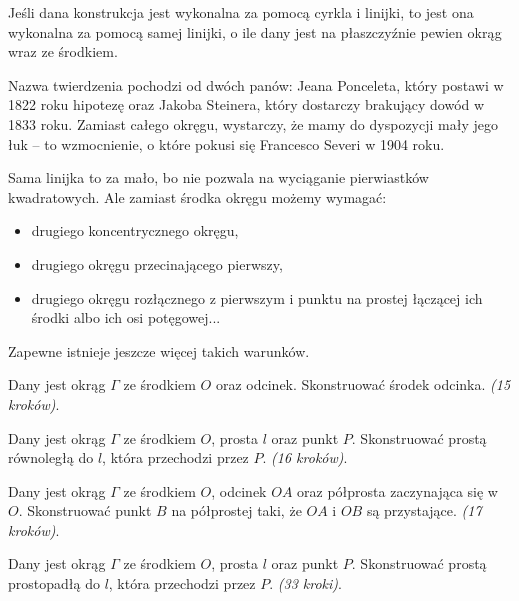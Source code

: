 %

\begin{theorem}
\label{thm:poncelet_steiner}%
    Jeśli dana konstrukcja jest wykonalna za pomocą cyrkla i linijki, to jest ona wykonalna za pomocą samej linijki, o ile dany jest na płaszczyźnie pewien okrąg wraz ze środkiem.
\end{theorem}

Nazwa twierdzenia pochodzi od dwóch panów: Jeana Ponceleta, który postawi w 1822 roku hipotezę oraz Jakoba Steinera, który dostarczy brakujący dowód w 1833 roku.
%
%
Zamiast całego okręgu, wystarczy, że mamy do dyspozycji mały jego łuk -- to wzmocnienie, o które pokusi się Francesco Severi w 1904 roku.

Sama linijka to za mało, bo nie pozwala na wyciąganie pierwiastków kwadratowych.
Ale zamiast środka okręgu możemy wymagać:
\begin{itemize}
    \item drugiego koncentrycznego okręgu,
    \item drugiego okręgu przecinającego pierwszy,
    \item drugiego okręgu rozłącznego z pierwszym i punktu na prostej łączącej ich środki albo ich osi potęgowej...
\end{itemize}
Zapewne istnieje jeszcze więcej takich warunków.

\begin{problem}
    Dany jest okrąg $\Gamma$ ze środkiem $O$ oraz odcinek.
    Skonstruować środek odcinka. \hfill \emph{(15 kroków)}. %
\end{problem}

\begin{problem}
    Dany jest okrąg $\Gamma$ ze środkiem $O$, prosta $l$ oraz punkt $P$.
    Skonstruować prostą równoległą do $l$, która przechodzi przez $P$. \hfill \emph{(16 kroków)}. %
\end{problem}

\begin{problem}
    Dany jest okrąg $\Gamma$ ze środkiem $O$, odcinek $OA$ oraz półprosta zaczynająca się w $O$.
    Skonstruować punkt $B$ na półprostej taki, że $OA$ i $OB$ są przystające. \hfill \emph{(17 kroków)}. %
\end{problem}

\begin{problem}
    Dany jest okrąg $\Gamma$ ze środkiem $O$, prosta $l$ oraz punkt $P$.
    Skonstruować prostą prostopadłą do $l$, która przechodzi przez $P$. \hfill \emph{(33 kroki)}. %
\end{problem}


